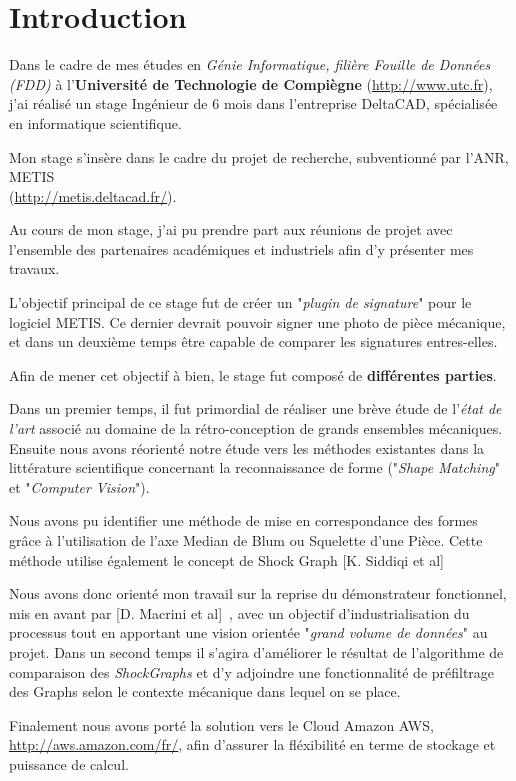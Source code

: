 \chapter*{Introduction}

Dans le cadre de mes études en \emph{Génie Informatique, filière Fouille de Données (FDD)} à l'\textbf{Université de Technologie de Compiègne} (\url{http://www.utc.fr}), j'ai réalisé un stage Ingénieur de 6 mois dans l'entreprise DeltaCAD, spécialisée en informatique scientifique. 


Mon stage s'insère dans le cadre du projet de recherche, subventionné par l'ANR, METIS \\(\url{http://metis.deltacad.fr/}).

Au cours de mon stage, j'ai pu prendre part aux réunions de projet avec l'ensemble des partenaires académiques et industriels afin d'y présenter mes travaux.

L'objectif principal de ce stage fut de créer un "\textit{plugin de signature}" pour le logiciel METIS. Ce dernier devrait pouvoir signer une photo de pièce mécanique, et dans un deuxième temps être capable de comparer les signatures entres-elles.

Afin de mener cet objectif à bien, le stage fut composé de \textbf{différentes parties}.

Dans un premier temps, il fut primordial de réaliser une brève étude de l'\textit{état de l'art} associé au domaine de la rétro-conception de grands ensembles mécaniques.
Ensuite nous avons réorienté notre étude vers les méthodes existantes dans la littérature scientifique concernant la reconnaissance de forme ("\textit{Shape Matching}" et "\textit{Computer Vision}").

Nous avons pu identifier une méthode de mise en correspondance des formes grâce à l'utilisation de l'axe Median de Blum ou Squelette d'une Pièce. Cette méthode utilise également le concept de Shock Graph [K. Siddiqi et al]~\cite{Siddiqi1999}

Nous avons donc orienté mon travail sur la reprise du démonstrateur fonctionnel, mis en avant par [D. Macrini et al]~\cite{Macrini2002}, avec un objectif d'industrialisation du processus tout en apportant une vision orientée "\textit{grand volume de données}" au projet.
Dans un second temps il s'agira d'améliorer le résultat de l'algorithme de comparaison des \textit{ShockGraphs} et d'y adjoindre une fonctionnalité de préfiltrage des Graphs selon le contexte mécanique dans lequel on se place.

Finalement nous avons porté la solution vers le Cloud Amazon AWS, \url{http://aws.amazon.com/fr/}, afin d'assurer la fléxibilité en terme de stockage et puissance de calcul.

